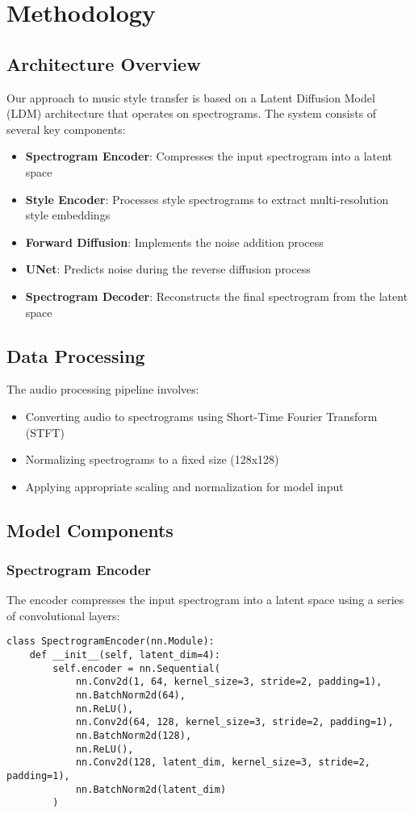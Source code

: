 \section{Methodology}

\subsection{Architecture Overview}
Our approach to music style transfer is based on a Latent Diffusion Model (LDM) architecture that operates on spectrograms. The system consists of several key components:

\begin{itemize}
    \item \textbf{Spectrogram Encoder}: Compresses the input spectrogram into a latent space
    \item \textbf{Style Encoder}: Processes style spectrograms to extract multi-resolution style embeddings
    \item \textbf{Forward Diffusion}: Implements the noise addition process
    \item \textbf{UNet}: Predicts noise during the reverse diffusion process
    \item \textbf{Spectrogram Decoder}: Reconstructs the final spectrogram from the latent space
\end{itemize}

\subsection{Data Processing}
The audio processing pipeline involves:
\begin{itemize}
    \item Converting audio to spectrograms using Short-Time Fourier Transform (STFT)
    \item Normalizing spectrograms to a fixed size (128x128)
    \item Applying appropriate scaling and normalization for model input
\end{itemize}

\subsection{Model Components}

\subsubsection{Spectrogram Encoder}
The encoder compresses the input spectrogram into a latent space using a series of convolutional layers:
\begin{lstlisting}
class SpectrogramEncoder(nn.Module):
    def __init__(self, latent_dim=4):
        self.encoder = nn.Sequential(
            nn.Conv2d(1, 64, kernel_size=3, stride=2, padding=1),
            nn.BatchNorm2d(64),
            nn.ReLU(),
            nn.Conv2d(64, 128, kernel_size=3, stride=2, padding=1),
            nn.BatchNorm2d(128),
            nn.ReLU(),
            nn.Conv2d(128, latent_dim, kernel_size=3, stride=2, padding=1),
            nn.BatchNorm2d(latent_dim)
        )
\end{lstlisting}

